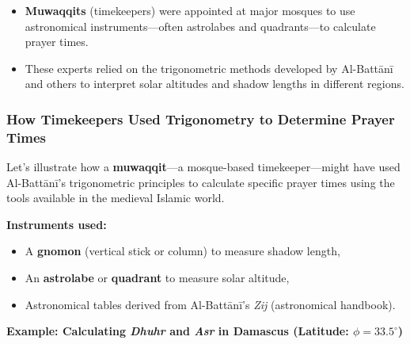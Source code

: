 \begin{itemize}
    \item \textbf{Muwaqqits} (timekeepers) were appointed at major mosques to use astronomical instruments—often astrolabes and quadrants—to calculate prayer times.
    \item These experts relied on the trigonometric methods developed by Al-Battānī and others to interpret solar altitudes and shadow lengths in different regions.
\end{itemize}


\subsubsection*{How Timekeepers Used Trigonometry to Determine Prayer Times}

Let’s illustrate how a \textbf{muwaqqit}—a mosque-based timekeeper—might have used Al-Battānī’s trigonometric principles to calculate specific prayer times using the tools available in the medieval Islamic world.

\medskip

\textbf{Instruments used:}
\begin{itemize}
    \item A \textbf{gnomon} (vertical stick or column) to measure shadow length,
    \item An \textbf{astrolabe} or \textbf{quadrant} to measure solar altitude,
    \item Astronomical tables derived from Al-Battānī’s \textit{Zij} (astronomical handbook).
\end{itemize}

\medskip

\textbf{Example: Calculating \textit{Dhuhr} and \textit{Asr} in Damascus (Latitude: \( \phi = 33.5^\circ \))}

